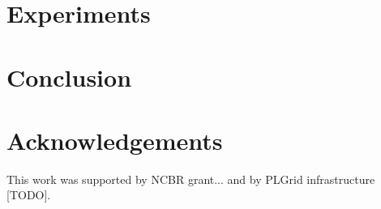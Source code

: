 \documentclass{IOS-Book-Article}
\theoremstyle{definition}
\begin{document}


\section{Experiments}
\label{sec:experiments}



\section{Conclusion}



\section*{Acknowledgements}

This work was supported by NCBR grant... and by PLGrid infrastructure [TODO].


\end{document}

